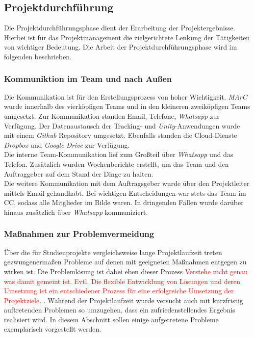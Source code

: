 \subsection{Projektdurchführung}
Die Projektdurchführungsphase dient der Erarbeitung der Projektergebnisse. Hierbei ist für das Projektmanagement die zielgerichtete Lenkung der Tätigkeiten von wichtiger Bedeutung. Die Arbeit der Projektdurchführungsphase wird im folgenden beschrieben.
\subsubsection{Kommuniktion im Team und nach Außen}
Die Kommunikation ist für den Erstellungsprozess von hoher Wichtigkeit.\textit{ MArC} wurde innerhalb des vierköpfigen Teams und in den kleineren zweiköpfigen Teams umgesetzt. Zur Kommunikation standen Email, Telefone, \textit{Whatsapp} zur Verfügung. Der Datenaustausch der Tracking- und \textit{Unity}-Anwendungen wurde mit einem \textit{Github} Repository umgesetzt. Ebenfalls standen die Cloud-Dienste \textit{Dropbox} und \textit{Google Drive} zur Verfügung.\\
Die interne Team-Kommunikation lief zum Großteil über \textit{Whatsapp} und das Telefon. Zusätzlich wurden Wochenberichte erstellt, um das Team und den Auftraggeber auf dem Stand der Dinge zu halten.\\
Die weitere Kommunikation mit dem Auftragsgeber wurde über den Projektleiter mittels Email gehandhabt. Bei wichtigen Entscheidungen war stets das Team im CC, sodass alle Mitglieder im Bilde waren. In dringenden Fällen wurde darüber hinaus zusätzlich über \textit{Whatsapp} kommuniziert.

\subsubsection{Maßnahmen zur Problemvermeidung}
Über die für Studienprojekte vergleichsweise lange Projektlaufzeit treten gezwungenermaßen Probleme auf denen mit geeigneten Maßnahmen entgegen zu wirken ist. Die Problemlösung ist dabei eben dieser Prozess \textcolor{red}{Verstehe nicht genau was damit gemeint ist. Evtl. Die flexible Entwicklung von Lösungen und deren Umsetzung ist ein entschiedener Prozess für eine erfolgreiche Umsetzung der Projektziele. }. Während der Projektlaufzeit wurde versucht auch mit kurzfristig auftretenden Problemen so umzugehen, dass ein zufriedenstellendes Ergebnis realisiert wird. In diesem Abschnitt sollen einige aufgetretene Probleme exemplarisch vorgestellt werden.

